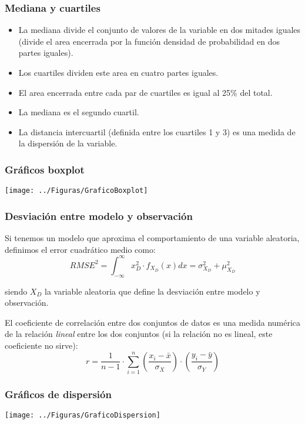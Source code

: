 \documentclass[serif, xcolor=dvipsnames]{beamer}
\begin{document}
\begin{frame}
\frametitle{Mediana y cuartiles}
\begin{itemize}
\item La mediana divide el conjunto de valores de la variable en dos mitades
iguales (divide el area encerrada por la función densidad de probabilidad
en dos partes iguales).
\item Los cuartiles dividen este area en cuatro partes iguales. 
\item El area encerrada entre cada par de cuartiles es igual al 25\% del
total. 
\item La mediana es el segundo cuartil. 
\item La distancia intercuartil (definida entre los cuartiles 1 y 3) es
una medida de la dispersión de la variable.
\end{itemize}

\end{frame}

\begin{frame}[plain]
\frametitle{Gráficos boxplot}

\begin{center}
\texttt{[image: ../Figuras/GraficoBoxplot]}
\par\end{center}


\end{frame}
\begin{frame}
\frametitle{Desviación entre modelo y observación}

Si tenemos un modelo que aproxima el comportamiento de una variable
aleatoria, definimos el error cuadrático medio como:\[
RMSE^{2}=\int_{-\infty}^{\infty}x^2_{D}\cdot f_{X_{D}}(x)dx=\sigma^2_{X_{D}}+\mu_{X_{D}}^{2}\]


siendo $X_{D}$ la variable aleatoria que define la desviación entre
modelo y observación. 

El coeficiente de correlación entre dos conjuntos de datos es una
medida numérica de la relación \emph{lineal }entre los dos conjuntos
(si la relación no es lineal, este coeficiente no sirve):\[
r=\frac{1}{n-1}\cdot\sum_{i=1}^{n}\left(\frac{x_{i}-\bar{x}}{\sigma_{X}}\right)\cdot\left(\frac{y_{i}-\bar{y}}{\sigma_{Y}}\right)\]



\end{frame}

\begin{frame}[plain]
\frametitle{Gráficos de dispersión}

\begin{center}
\texttt{[image: ../Figuras/GraficoDispersion]}
\par\end{center}


\end{frame}
\end{document}

